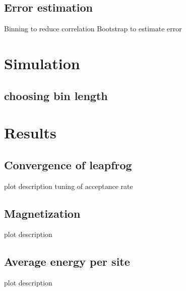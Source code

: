 \documentclass{scrartcl}
\begin{document}
\subsection{Error estimation}
Binning to reduce correlation
Bootstrap to estimate error

\section{Simulation}

\subsection{choosing bin length}

\section{Results}

\subsection{Convergence of leapfrog}
plot description tuning of acceptance rate
\subsection{Magnetization}
plot description
\subsection{Average energy per site}
plot description

\newpage	
\listoffigures
\printbibliography
\end{document}
